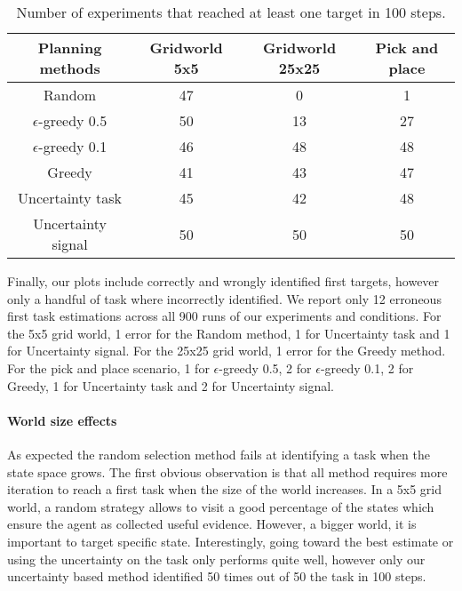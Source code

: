 \begin{table}[!ht]
\centering
{}
\begin{tabular}{c c c c}
    Planning methods & Gridworld 5x5 & Gridworld 25x25 &  Pick and place \\ \hline
    Random & 47 & 0 & 1 \\ 
    $\epsilon$-greedy 0.5 & 50 & 13 & 27 \\
    $\epsilon$-greedy 0.1 & 46 & 48 & 48 \\
    Greedy & 41 & 43 & 47 \\
    Uncertainty task & 45 & 42 & 48 \\
    Uncertainty signal & 50 & 50 & 50 \\
\end{tabular}
\caption{Number of experiments that reached at least one target in 100 steps.}
\label{tab:wordlpropertiesnreach}
\end{table}


Finally, our plots include correctly and wrongly identified first targets, however only a handful of task where incorrectly identified. We report only 12 erroneous first task estimations across all 900 runs of our experiments and conditions. For the 5x5 grid world, 1 error for the Random method, 1 for Uncertainty task and 1 for Uncertainty signal. For the 25x25 grid world, 1 error for the Greedy method. For the pick and place scenario, 1 for $\epsilon$-greedy 0.5, 2 for $\epsilon$-greedy 0.1, 2 for Greedy, 1 for Uncertainty task and 2 for Uncertainty signal.


\paragraph{World size effects}

As expected the random selection method fails at identifying a task when the state space grows. The first obvious observation is that all method requires more iteration to reach a first task when the size of the world increases. In a 5x5 grid world, a random strategy allows to visit a good percentage of the states which ensure the agent as collected useful evidence. However, a bigger world, it is important to target specific state. Interestingly, going toward the best estimate or using the uncertainty on the task only performs quite well, however only our uncertainty based method identified 50 times out of 50 the task in 100 steps.

